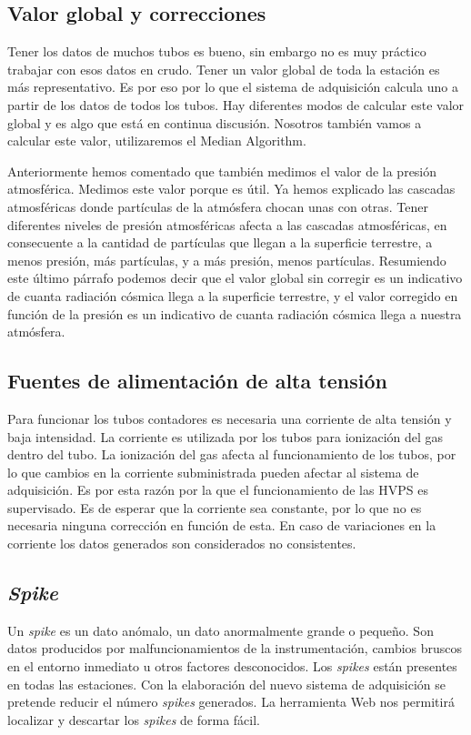 	\subsection{Valor global y correcciones}
		Tener los datos de muchos tubos es bueno, sin embargo no es muy práctico trabajar con esos datos en crudo. Tener un valor global de toda la
		estación es más representativo. Es por eso por lo que el sistema de adquisición calcula uno a partir de los datos de todos los tubos. Hay 
		diferentes modos de calcular este valor global y es algo que está en continua discusión. Nosotros también vamos a calcular este valor, 
		utilizaremos el Median Algorithm\cite{MedianAlgr}.
		\par
		Anteriormente hemos comentado que también medimos el valor de la presión atmosférica. Medimos este valor porque es útil. Ya hemos explicado
		las cascadas atmosféricas donde partículas de la atmósfera chocan unas con otras. Tener diferentes niveles de presión atmosféricas afecta a
		las cascadas atmosféricas, en consecuente a la cantidad de partículas que llegan a la superficie terrestre, a menos presión, más partículas,
		y a más presión, menos partículas. Resumiendo este último párrafo  podemos decir que el valor global sin corregir es un indicativo de cuanta
		radiación cósmica llega a la superficie terrestre, y el valor corregido en función de la presión es un indicativo de cuanta radiación cósmica
		llega a nuestra atmósfera.
	\subsection{Fuentes de alimentación de alta tensión}
		Para funcionar los tubos contadores es necesaria una corriente de alta tensión y baja intensidad. La corriente es utilizada por los tubos
		para ionización del gas dentro del tubo. La ionización del gas afecta al funcionamiento de los tubos, por lo que cambios en la corriente
		subministrada pueden afectar al sistema de adquisición. Es por esta razón por la que el funcionamiento de las HVPS es supervisado. Es de esperar
		que la corriente sea constante, por lo que no es necesaria ninguna corrección en función de esta. En caso de variaciones en la corriente los datos
		generados son considerados no consistentes.
	\subsection{\emph{Spike}}
		Un \emph{spike} es un dato anómalo, un dato anormalmente grande o pequeño. Son datos producidos por malfuncionamientos de la
		instrumentación, cambios bruscos en el entorno inmediato u otros factores desconocidos. Los \emph{spikes} están presentes en todas las
		estaciones. Con la elaboración del nuevo sistema de adquisición se pretende reducir el número \emph{spikes} generados. La herramienta
		Web nos permitirá localizar y descartar los \emph{spikes} de forma fácil.  
